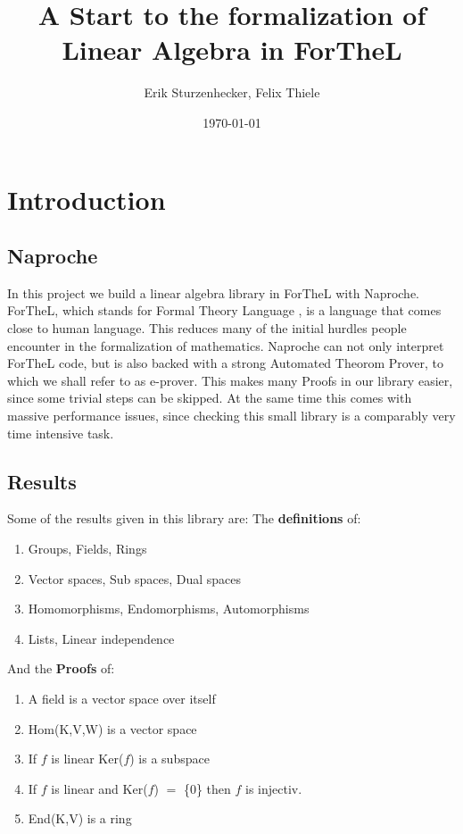 \documentclass[11pt]{article}
\author{Erik Sturzenhecker, Felix Thiele}
\title{A Start to the formalization of Linear Algebra in ForTheL}
\date{\today}
\begin{document}
\maketitle

\newpage 
\setcounter{tocdepth}{4}
\tableofcontents


\newpage 
\section{Introduction}
\subsection{Naproche}
In this project we build a linear algebra library in ForTheL with Naproche. ForTheL, which stands for Formal Theory Language , is a language that comes close to human language. This reduces many of the initial hurdles people encounter in the formalization of mathematics. Naproche can not only interpret ForTheL code, but is also backed with a strong Automated Theorom Prover, to which we shall refer to as e-prover. This makes many Proofs in our library easier, since some trivial steps can be skipped. At the same time this comes with massive performance issues, since checking this small library is a comparably very time intensive task.

\subsection{Results}
Some of the results given in this library are:
\newline
The \textbf{definitions} of:
\begin{enumerate}[noitemsep]
\item Groups, Fields, Rings
\item Vector spaces, Sub spaces, Dual spaces
\item Homomorphisms, Endomorphisms, Automorphisms
\item Lists, Linear independence
\end{enumerate}
And the \textbf{Proofs} of:
\begin{enumerate}[noitemsep]
\item A field is a vector space over itself
\item Hom(K,V,W) is a vector space
\item If $f$ is linear Ker($f$) is a subspace
\item If $f$ is linear and Ker($f$) $=$ \{0\} then $f$ is injectiv.
\item End(K,V) is a ring
\end{enumerate}
\end{document}
